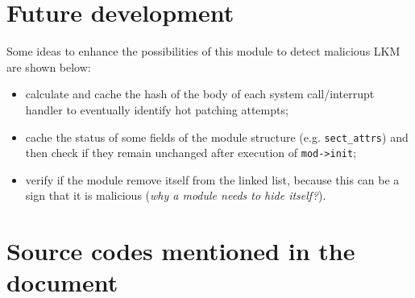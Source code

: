 \documentclass{article}
\begin{document}
	\section{Future development}
	Some ideas to enhance the possibilities of this module to detect malicious LKM are shown below:
	\begin{itemize}
		\item calculate and cache the hash of the body of each system call/interrupt handler to eventually identify hot
		patching attempts;
		\item cache the status of some fields of the module structure (e.g. \texttt{sect\_attrs}) and then check if
		they remain unchanged after execution of \texttt{mod->init};
		\item verify if the module remove itself from the linked list, because this can be a sign that it is
		malicious (\textit{why a module needs to hide itself?}).
	\end{itemize}

	\section{Source codes mentioned in the document}
	

	

	

	

	

	
\end{document}
